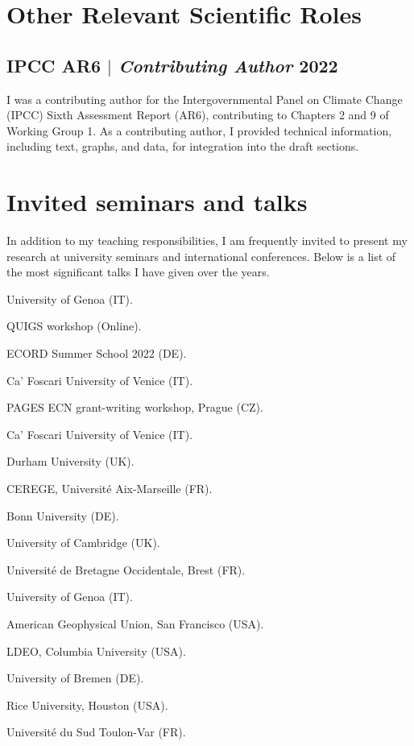 \documentclass[11pt]{article}
\begin{document}
\section{Other Relevant Scientific Roles}
\subsection{IPCC AR6 $|$ {\normalfont\textit{Contributing Author}} \hfill 2022}
{\footnotesize I was a contributing author for the Intergovernmental Panel on Climate Change (IPCC) Sixth Assessment Report (AR6), contributing to Chapters 2 and 9 of Working Group 1. As a contributing author, I provided technical information, including text, graphs, and data, for integration into the draft sections.}

\section{Invited seminars and talks}
{\normalfont In addition to my teaching responsibilities, I am frequently invited to present my research at university seminars and international conferences. Below is a list of the most significant talks I have given over the years.}\\
{\footnotesize 
\begin{description}
  \item [2023] University of Genoa (IT).
  \item [2023] QUIGS workshop (Online).
  \item [2022] ECORD Summer School 2022 (DE).
  \item [2021] Ca’ Foscari University of Venice (IT).
  \item [2019] PAGES ECN grant-writing workshop, Prague (CZ).
  \item [2018] Ca’ Foscari University of Venice (IT).
  \item [2018] Durham University (UK).
  \item [2018] CEREGE, Université Aix-Marseille (FR).
  \item [2017] Bonn University (DE).
  \item [2017] University of Cambridge (UK).
  \item [2017] Université de Bretagne Occidentale, Brest (FR).
  \item [2017] University of Genoa (IT).
  \item [2016] American Geophysical Union, San Francisco (USA).
  \item [2015] LDEO, Columbia University (USA).
  \item [2013] University of Bremen (DE).
  \item [2012] Rice University, Houston (USA).
  \item [2008] Université du Sud Toulon-Var (FR).
  \item \end{description}}
\newpage
\end{document}
